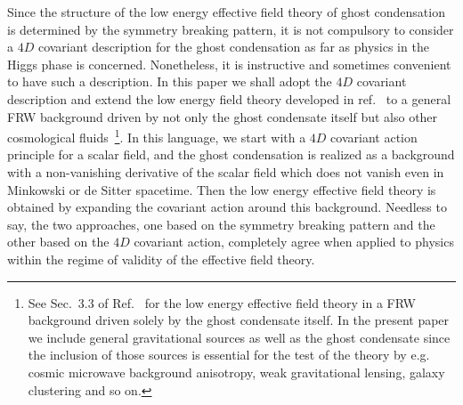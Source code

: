 Since the structure of the low energy effective field theory of ghost
condensation is determined by the symmetry breaking pattern, it is
not compulsory to consider a $4D$ covariant description for the ghost 
condensation as far as physics in the Higgs phase is
concerned. Nonetheless, it is instructive and sometimes convenient to
have such a description. In this paper we shall adopt the $4D$ covariant
description and extend the low energy field theory developed in
ref.~\cite{Arkani-Hamed:2003uy} to a general FRW background driven by not
only the ghost condensate itself but also other cosmological
fluids~\footnote{
See Sec.~3.3 of Ref.~\cite{Creminelli:2006xe} for the low energy
effective field theory in a FRW background driven solely by the ghost
condensate itself. In the present paper we include general gravitational
sources as well as the ghost condensate since the inclusion of those 
sources is essential for the test of the theory by e.g. cosmic microwave
background anisotropy, weak gravitational lensing, galaxy clustering and
so on.}.
In this language, we start with a $4D$ covariant action principle for a
scalar field, and the ghost condensation is realized as a background
with a non-vanishing derivative of the scalar field which does not
vanish even in Minkowski or de Sitter spacetime. Then the low energy
effective field theory is obtained by expanding the covariant action
around this background. Needless to say, the two approaches, one based
on the symmetry breaking pattern and the other based on the $4D$
covariant action, completely agree when applied to physics within the
regime of validity of the effective field theory. 



